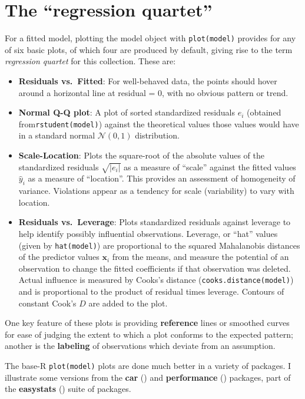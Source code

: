 \documentclass[
  letterpaper,
  10pt,
  krantz2]{krantz}
\begin{document}
\section{The ``regression quartet''}\label{the-regression-quartet}

For a fitted model, plotting the model object with \texttt{plot(model)}
provides for any of six basic plots, of which four are produced by
default, giving rise to the term \emph{regression quartet} for this
collection. These are:

\begin{itemize}
\item
  \textbf{Residuals vs.~Fitted}: For well-behaved data, the points
  should hover around a horizontal line at residual = 0, with no obvious
  pattern or trend.
\item
  \textbf{Normal Q-Q plot}: A plot of sorted standardized residuals
  \(e_i\) (obtained from\texttt{rstudent(model)}) against the
  theoretical values those values would have in a standard normal
  \(\mathcal{N}(0, 1)\) distribution.
\item
  \textbf{Scale-Location}: Plots the square-root of the absolute values
  of the standardized residuals \(\sqrt{| e_i |}\) as a measure of
  ``scale'' against the fitted values \(\hat{y}_i\) as a measure of
  ``location''. This provides an assessment of homogeneity of variance.
  Violations appear as a tendency for scale (variability) to vary with
  location.
\item
  \textbf{Residuals vs.~Leverage}: Plots standardized residuals against
  leverage to help identify possibly influential observations. Leverage,
  or ``hat'' values (given by \texttt{hat(model)}) are proportional to
  the squared Mahalanobis distances of the predictor values
  \(\mathbf{x}_i\) from the means, and measure the potential of an
  observation to change the fitted coefficients if that observation was
  deleted. Actual influence is measured by Cooks's distance
  (\texttt{cooks.distance(model)}) and is proportional to the product of
  residual times leverage. Contours of constant Cook's \(D\) are added
  to the plot.
\end{itemize}

One key feature of these plots is providing \textbf{reference} lines or
smoothed curves for ease of judging the extent to which a plot conforms
to the expected pattern; another is the \textbf{labeling} of
observations which deviate from an assumption.

The base-R \texttt{plot(model)} plots are done much better in a variety
of packages. I illustrate some versions from the \textbf{car}
() and \textbf{performance}
()
packages, part of the \textbf{easystats}
() suite of packages.
\end{document}
